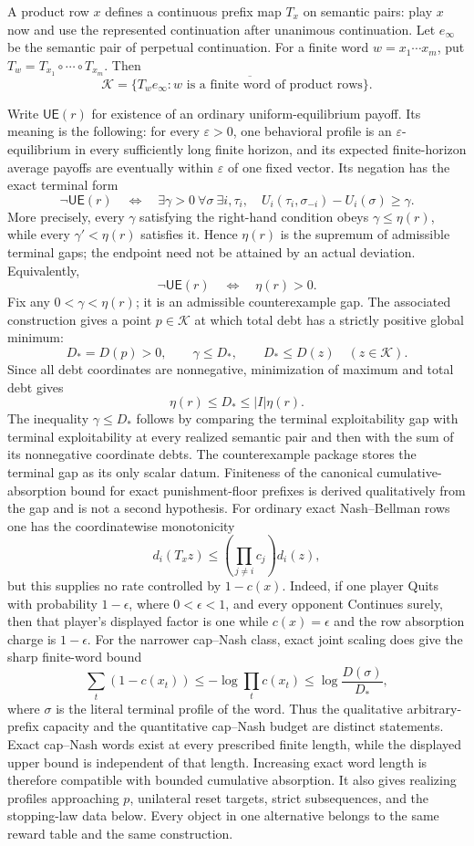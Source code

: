 \documentclass[11pt]{article}
\newcommand{\K}{\mathcal K}
\newcommand{\UE}{\mathsf{UE}}
\begin{document}
A product row $x$ defines a continuous prefix map $T_x$ on semantic pairs:
play $x$ now and use the represented continuation after unanimous
continuation.  Let $e_\infty$ be the semantic pair of perpetual continuation.
For a finite word $w=x_1\cdots x_m$, put
$T_w=T_{x_1}\circ\cdots\circ T_{x_m}$.  Then
\[
 \boxed{\K=\overline{\{T_w e_\infty:
       w\text{ is a finite word of product rows}\}}.}
\]

Write $\UE(r)$ for existence of an ordinary uniform-equilibrium payoff.  Its
meaning is the following: for every $\varepsilon>0$, one behavioral profile
is an $\varepsilon$-equilibrium in every sufficiently long finite horizon,
and its expected finite-horizon average payoffs are eventually within
$\varepsilon$ of one fixed vector.  Its
negation has the exact terminal form
\[
 \neg\UE(r)
 \quad\Longleftrightarrow\quad
 \exists\gamma>0\ \forall\sigma\ \exists i,\tau_i,
 \quad
 U_i(\tau_i,\sigma_{-i})-U_i(\sigma)\ge\gamma.
\]
More precisely, every $\gamma$ satisfying the right-hand condition obeys
$\gamma\le\eta(r)$, while every $\gamma'<\eta(r)$ satisfies it.  Hence
$\eta(r)$ is the supremum of admissible terminal gaps; the endpoint need not
be attained by an actual deviation.  Equivalently,
\[
 \neg\UE(r)\quad\Longleftrightarrow\quad\eta(r)>0.
\]
Fix any $0<\gamma<\eta(r)$; it is an admissible counterexample gap.  The
associated construction gives a
point $p\in\K$ at which total debt has a strictly positive global minimum:
\[
 D_*=D(p)>0,
 \qquad \gamma\le D_*,
 \qquad D_*\le D(z)\quad(z\in\K).
\]
Since all debt coordinates are nonnegative, minimization of maximum and
total debt gives
\[
 \boxed{\eta(r)\le D_*\le |I|\eta(r).}
\]
The inequality $\gamma\le D_*$ follows by comparing the terminal
exploitability gap with terminal exploitability at every realized semantic
pair and then with the sum of its nonnegative coordinate debts.  The
counterexample package stores the terminal gap as its only scalar datum.
Finiteness of the canonical cumulative-absorption bound for exact
punishment-floor prefixes is derived qualitatively from the gap and is not a
second hypothesis.  For ordinary exact Nash--Bellman rows one has the
coordinatewise monotonicity
\[
 d_i(T_xz)\le\left(\prod_{j\ne i}c_j\right)d_i(z),
\]
but this supplies no rate controlled by $1-c(x)$.  Indeed, if one player
Quits with probability $1-\epsilon$, where $0<\epsilon<1$, and every
opponent Continues surely, then that player's displayed factor is one while
$c(x)=\epsilon$ and the row absorption charge is $1-\epsilon$.  For the
narrower cap--Nash class, exact joint
scaling does give the sharp finite-word bound
\[
 \sum_t(1-c(x_t))\le-\log\prod_t c(x_t)
 \le\log\frac{D(\sigma)}{D_*},
\]
where $\sigma$ is the literal terminal profile of the word.  Thus the
qualitative arbitrary-prefix capacity and the quantitative cap--Nash budget
are distinct statements.  Exact cap--Nash words exist at every prescribed
finite length, while the displayed upper bound is independent of that
length.  Increasing exact word length is therefore compatible with bounded
cumulative absorption.
It also gives realizing profiles approaching $p$, unilateral reset targets,
strict subsequences, and the stopping-law data below.  Every object in one
alternative belongs to the same reward table and the same construction.
\end{document}
